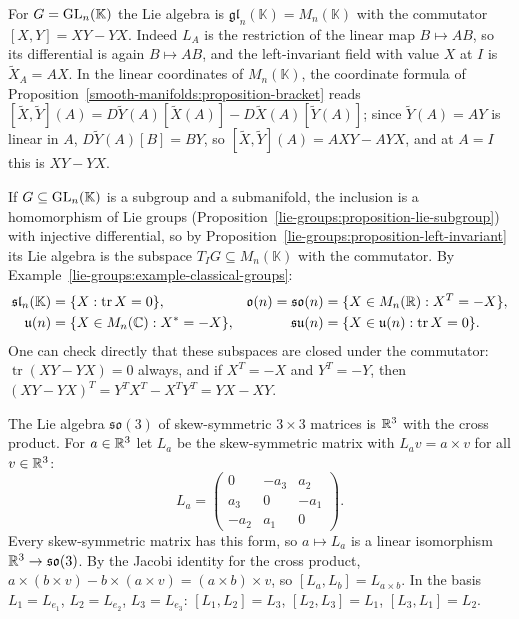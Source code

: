 \begin{example}\label{lie-groups:example-matrix-lie-algebras}
For $G = \mathrm{GL}_n(\mathbb{K})$ the Lie algebra is $\mathfrak{gl}_n(\mathbb{K}) = M_n(\mathbb{K})$ with the commutator $[X, Y] = XY - YX$. Indeed $L_A$ is the
restriction of the linear map $B \mapsto AB$, so its differential is again $B \mapsto AB$, and the left-invariant field with value $X$ at $I$ is
$\widetilde{X}_A = AX$. In the linear coordinates of $M_n(\mathbb{K})$, the coordinate formula of Proposition~\ref{smooth-manifolds:proposition-bracket} reads
$[\widetilde{X}, \widetilde{Y}](A) = D\widetilde{Y}(A)[\widetilde{X}(A)] - D\widetilde{X}(A)[\widetilde{Y}(A)]$; since $\widetilde{Y}(A) = AY$ is linear in
$A$, $D\widetilde{Y}(A)[B] = BY$, so $[\widetilde{X}, \widetilde{Y}](A) = AXY - AYX$, and at $A = I$ this is $XY - YX$.

If $G \subseteq \mathrm{GL}_n(\mathbb{K})$ is a subgroup and a submanifold, the inclusion is a homomorphism of Lie groups
(Proposition~\ref{lie-groups:proposition-lie-subgroup}) with injective differential, so by
Proposition~\ref{lie-groups:proposition-left-invariant} its Lie algebra is the subspace $T_IG \subseteq M_n(\mathbb{K})$ with the commutator. By
Example~\ref{lie-groups:example-classical-groups}:
\[
\begin{aligned}
\mathfrak{sl}_n(\mathbb{K}) &= \{X : \operatorname{tr}X = 0\}, & \mathfrak{o}(n) = \mathfrak{so}(n) &= \{X \in M_n(\mathbb{R}) : X^T = -X\},\\
\mathfrak{u}(n) &= \{X \in M_n(\mathbb{C}) : X^* = -X\}, & \mathfrak{su}(n) &= \{X \in \mathfrak{u}(n) : \operatorname{tr}X = 0\}.
\end{aligned}
\]
One can check directly that these subspaces are closed under the commutator: $\operatorname{tr}(XY - YX) = 0$ always, and if $X^T = -X$ and $Y^T = -Y$, then
$(XY - YX)^T = Y^TX^T - X^TY^T = YX - XY$.
\end{example}

\begin{example}\label{lie-groups:example-so3}
The Lie algebra $\mathfrak{so}(3)$ of skew-symmetric $3 \times 3$ matrices is $\mathbb{R}^3$ with the cross product. For $a \in \mathbb{R}^3$ let $L_a$ be the skew-symmetric
matrix with $L_av = a \times v$ for all $v \in \mathbb{R}^3$:
\[
L_a = \begin{pmatrix} 0 & -a_3 & a_2\\ a_3 & 0 & -a_1\\ -a_2 & a_1 & 0\end{pmatrix}.
\]
Every skew-symmetric matrix has this form, so $a \mapsto L_a$ is a linear isomorphism $\mathbb{R}^3 \to \mathfrak{so}(3)$. By the Jacobi identity for the cross
product, $a \times (b \times v) - b \times (a \times v) = (a \times b) \times v$, so $[L_a, L_b] = L_{a \times b}$. In the basis $L_1 = L_{e_1}$, $L_2 = L_{e_2}$,
$L_3 = L_{e_3}$: $[L_1, L_2] = L_3$, $[L_2, L_3] = L_1$, $[L_3, L_1] = L_2$.
\end{example}

